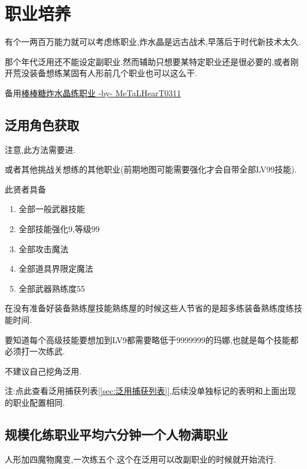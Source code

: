 
	\section{职业培养}

	有个一两百万能力就可以考虑练职业,炸水晶是远古战术,早落后于时代新技术太久.

	那个年代泛用还不能设定副职业.然而辅助只想要某特定职业还是很必要的,或者刚开荒没装备想练某固有人形前几个职业也可以这么干.

	备用\href{http://tieba.baidu.com/p/3717431968}{棒棒糖炸水晶练职业 -by- MeTaLHearT0311}

		\subsection{泛用角色获取}

		注意,此方法需要进{\color{red}{修罗以后}}.

		{\color{red}{去兔兔魔界挑战关,抓捕贤者}}或者其他挑战关想练的其他职业(前期地图可能需要强化才会自带全部LV99技能).

		此贤者具备
		\begin{enumerate}
			\item 全部一般武器技能
			\item 全部技能强化9,等级99
			\item 全部攻击魔法
			\item 全部道具界限定魔法
			\item 全部武器熟练度55
		\end{enumerate}
		
		在没有准备好装备熟练屋技能熟练屋的时候这些人节省的是超多练装备熟练度练技能时间.

		要知道每个高级技能要想加到LV9都需要略低于9999999的玛娜,也就是每个技能都必须打一次练武.

		不建议自己挖角泛用.

		注:点此查看泛用捕获列表[\ref{sec:泛用捕获列表}],后续没单独标记的表明和上面出现的职业配置相同.


		\subsection{规模化练职业平均六分钟一个人物满职业}

		人形加四魔物魔变,一次练五个.这个在泛用可以改副职业的时候就开始流行.

